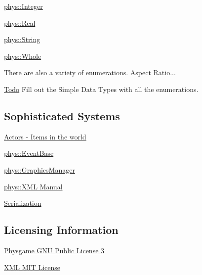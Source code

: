 \hyperlink{namespacephys_a7f09bf5585b2bb97613cd9aad4273a81}{phys::Integer}

\hyperlink{namespacephys_af7eb897198d265b8e868f45240230d5f}{phys::Real}

\hyperlink{namespacephys_aa03900411993de7fbfec4789bc1d392e}{phys::String}

\hyperlink{namespacephys_a460f6bc24c8dd347b05e0366ae34f34a}{phys::Whole}

\begin{DoxyParagraph}{There are also a variety of enumerations. Aspect Ratio...}

\end{DoxyParagraph}
\begin{Desc}
\item[\hyperlink{todo__todo000034}{Todo}]Fill out the Simple Data Types with all the enumerations.\end{Desc}
\hypertarget{index_Sophisticated}{}\subsection{Sophisticated Systems}\label{index_Sophisticated}
\hyperlink{classphys_1_1ActorBase}{Actors -\/ Items in the world}

\hyperlink{classphys_1_1EventBase}{phys::EventBase}

\hyperlink{classphys_1_1GraphicsManager}{phys::GraphicsManager}

\hyperlink{XMLManual}{phys::XML Manual}

\hyperlink{Serialization}{Serialization}\hypertarget{index_Licensing}{}\subsection{Licensing Information}\label{index_Licensing}
\hyperlink{GPLLicense}{Physgame GNU Public License 3}

\hyperlink{OriginalpugixmlLicense}{XML MIT License} 